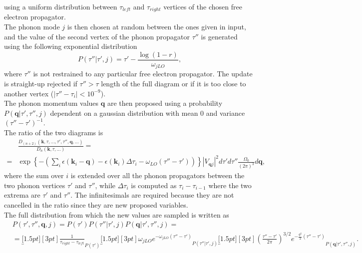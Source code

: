 using a uniform distribution between $\tau_{left}$ and $\tau_{right}$ vertices of the chosen free electron propagator.\\
The phonon mode $j$ is then chosen at random between the ones given in input, and the value of the second vertex of the phonon propagator $\tau''$ is generated using the
following exponential distribution
\begin{equation}
    P(\tau''|\tau',j)=\tau'-\frac{\log(1-r)}{\omega_{jLO}},
\end{equation}
where $\tau''$ is not restrained to any particular free electron propagator. The update is straight-up rejected if $\tau''>\tau$ length of the 
full diagram or if it is too close to another vertex ($|\tau''-\tau_i|<10^{-9}$).\\
The phonon momentum values $\mathbf{q}$ are then proposed using a probability $P(\mathbf{q}|\tau',\tau'',j)$ dependent on a gaussian distribution with 
mean $0$ and variance $(\tau''-\tau')^{-1}$.\\
The ratio of the two diagrams is
\begin{equation}
\begin{split}
    &\frac{D_{(n+2)}(\mathbf{k},\tau,...,\tau',\tau'',\mathbf{q},...)}{D_{n}(\mathbf{k},\tau,...)}=\\
    =&\exp{\left\{-\left(\sum_i\epsilon(\mathbf{k}_i-\mathbf{q})-\epsilon(\mathbf{k}_i)\Delta\tau_i-\omega_{LO}(\tau''-\tau')\right)\right\}}|V_{\mathbf{q}j}|^2d\tau'd\tau''\frac{\Omega_0}{(2\pi)^3}d\mathbf{q},
\end{split}
\end{equation}
where the sum over $i$ is extended over all the phonon propagators between the two phonon vertices $\tau'$ and $\tau''$, while $\Delta\tau_i$ is computed as $\tau_i-\tau_{i-1}$ where the two 
extrema are $\tau'$ and $\tau''$. The infinitesimals are required because they are not cancelled in the ratio since they are new proposed variables.\\
The full distribution from which the new values are sampled is written as
\begin{equation}
\begin{split}
    &P(\tau',\tau'',\mathbf{q},j)=P(\tau')P(\tau''|\tau',j)P(\mathbf{q}|\tau',\tau'',j)=\\
    &=\underbracket[1.5pt][3pt]{\frac{1}{\tau_{right}-\tau_{left}}}_{P(\tau')}\underbracket[1.5pt][3pt]{\omega_{jLO}e^{-\omega_{jLO}(\tau''-\tau')}}_{P(\tau''|\tau',j)}
    \underbracket[1.5pt][3pt]{\left(\frac{\tau''-\tau'}{2\pi}\right)^{3/2}e^{-\frac{q^2}{2}(\tau''-\tau')}}_{P(\mathbf{q}|\tau',\tau'',j)}.
\end{split}
\end{equation}
